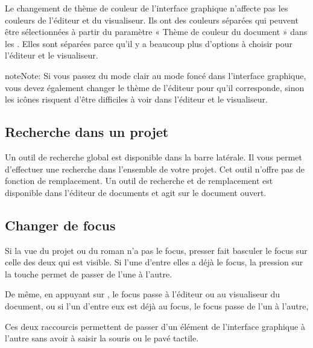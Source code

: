 \documentclass[a4paper,11pt,french]{sphinxmanual}
\begin{document}
\sphinxAtStartPar
Le changement de thème de couleur de l’interface graphique n’affecte pas les couleurs de l’éditeur et du visualiseur. Ils ont des couleurs séparées qui peuvent être sélectionnées à partir du paramètre « Thème de couleur du document » dans les . Elles sont séparées parce qu’il y a beaucoup plus d’options à choisir pour l’éditeur et le visualiseur.

\begin{sphinxadmonition}{note}{Note:}
\sphinxAtStartPar
Si vous passez du mode clair au mode foncé dans l’interface graphique, vous devez également changer le thème de l’éditeur pour qu’il corresponde, sinon les icônes risquent d’être difficiles à voir dans l’éditeur et le visualiseur.
\end{sphinxadmonition}


\subsection{Recherche dans un projet}
\label{\detokenize{usage_breakdown:project-search}}
\sphinxAtStartPar
Un outil de recherche global est disponible dans la barre latérale. Il vous permet d’effectuer une recherche dans l’ensemble de votre projet. Cet outil n’offre pas de fonction de remplacement. Un outil de recherche et de remplacement est disponible dans l’éditeur de documents et agit sur le document ouvert.

\sphinxAtStartPar
{}


\subsection{Changer de focus}
\label{\detokenize{usage_breakdown:switching-focus}}
\sphinxAtStartPar
Si la vue du projet ou du roman n’a pas le focus, presser  fait basculer le focus sur celle des deux qui est visible. Si l’une d’entre elles a déjà le focus, la pression sur la touche permet de passer de l’une à l’autre.

\sphinxAtStartPar
De même, en appuyant sur , le focus passe à l’éditeur ou au visualiseur du document, ou si l’un d’entre eux est déjà au focus, le focus passe de l’un à l’autre,

\sphinxAtStartPar
Ces deux raccourcis permettent de passer d’un élément de l’interface graphique à l’autre sans avoir à saisir la souris ou le pavé tactile.
\end{document}
